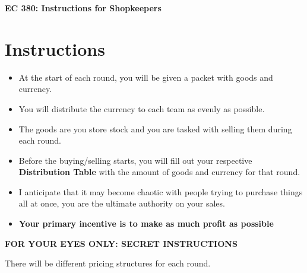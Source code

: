 \documentclass[12pt]{article}
\begin{document}
\selectfont

\begin{center}
    \textbf{\huge EC 380: Instructions for Shopkeepers}\\ 
    \vspace{0.1in}
\end{center}

\section*{Instructions}

\begin{itemize}
    \item At the start of each round, you will be given a packet with goods and currency.
    \item You will distribute the currency to each team as evenly as possible.
    \item The goods are you store stock and you are tasked with selling them during each round.
    \item Before the buying/selling starts, you will fill out your respective \textbf{Distribution Table} with the amount of goods and currency for that round.
    \item I anticipate that it may become chaotic with people trying to purchase things all at once, you are the ultimate authority on your sales.
    \item \textbf{Your primary incentive is to make as much profit as possible}
\end{itemize}

\vspace*{1in}

\makebox[\textwidth]{\dotfill}

\vspace*{0.5in}

\begin{center}
    \textbf{\large FOR YOUR EYES ONLY: SECRET INSTRUCTIONS}
\end{center}

There will be different pricing structures for each round. 
\end{document}
